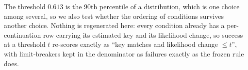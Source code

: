 \documentclass{article}
\begin{document}
%
The threshold $0.613$ is the $90$th percentile of a distribution, which is one choice
among several, so we also test whether the ordering of conditions survives another
choice. Nothing is regenerated here: every condition already has a
per-continuation row carrying its estimated key and its likelihood change, so success at a
threshold $t$ re-scores exactly as ``key matches and likelihood change $\le t$'', with
limit-breakers kept in the denominator as failures exactly as the frozen rule does.
\end{document}
